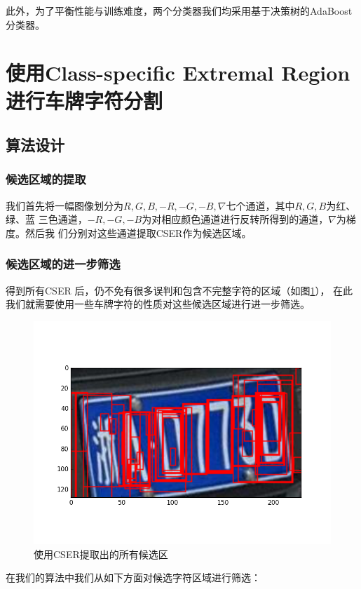 此外，为了平衡性能与训练难度，两个分类器我们均采用基于决策树的AdaBoost分类器。

\section{使用Class-specific Extremal Region进行车牌字符分割}

\subsection{算法设计}

\subsubsection{候选区域的提取}

我们首先将一幅图像划分为$R,G,B,-R,-G,-B,\nabla$七个通道，其中$R,G,B$为红、绿、蓝
三色通道，$-R,-G,-B$为对相应颜色通道进行反转所得到的通道，$\nabla$为梯度。然后我
们分别对这些通道提取CSER作为候选区域。

\subsubsection{候选区域的进一步筛选}

得到所有CSER 后，仍不免有很多误判和包含不完整字符的区域（如图\ref{Fig:AllERs}），
在此我们就需要使用一些车牌字符的性质对这些候选区域进行进一步筛选。

\begin{figure}[ht]
  \centering
  \includegraphics[width=0.8\linewidth]{./Figure/AllERs.png}
  \caption{使用CSER提取出的所有候选区}\label{Fig:AllERs}
\end{figure}

在我们的算法中我们从如下方面对候选字符区域进行筛选：

